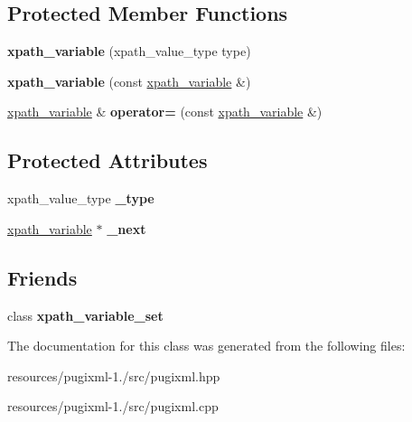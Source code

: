 \subsection*{Protected Member Functions}
\begin{DoxyCompactItemize}
\item 
\hypertarget{classpugi_1_1xpath__variable_a209a8e2cf18a2fa4e37faddaa216dda2}{{\bfseries xpath\+\_\+variable} (xpath\+\_\+value\+\_\+type type)}\label{classpugi_1_1xpath__variable_a209a8e2cf18a2fa4e37faddaa216dda2}

\item 
\hypertarget{classpugi_1_1xpath__variable_a2d805ed204c1fec482f859217d1baa4a}{{\bfseries xpath\+\_\+variable} (const \hyperlink{classpugi_1_1xpath__variable}{xpath\+\_\+variable} \&)}\label{classpugi_1_1xpath__variable_a2d805ed204c1fec482f859217d1baa4a}

\item 
\hypertarget{classpugi_1_1xpath__variable_a0cd0e1223e99c0baf46488cfd2079961}{\hyperlink{classpugi_1_1xpath__variable}{xpath\+\_\+variable} \& {\bfseries operator=} (const \hyperlink{classpugi_1_1xpath__variable}{xpath\+\_\+variable} \&)}\label{classpugi_1_1xpath__variable_a0cd0e1223e99c0baf46488cfd2079961}

\end{DoxyCompactItemize}
\subsection*{Protected Attributes}
\begin{DoxyCompactItemize}
\item 
\hypertarget{classpugi_1_1xpath__variable_aefb30100ab8bf3cf2ba623dd6ffbbd35}{xpath\+\_\+value\+\_\+type {\bfseries \+\_\+type}}\label{classpugi_1_1xpath__variable_aefb30100ab8bf3cf2ba623dd6ffbbd35}

\item 
\hypertarget{classpugi_1_1xpath__variable_a0979cb72473e77a1b6d213046abfc46e}{\hyperlink{classpugi_1_1xpath__variable}{xpath\+\_\+variable} $\ast$ {\bfseries \+\_\+next}}\label{classpugi_1_1xpath__variable_a0979cb72473e77a1b6d213046abfc46e}

\end{DoxyCompactItemize}
\subsection*{Friends}
\begin{DoxyCompactItemize}
\item 
\hypertarget{classpugi_1_1xpath__variable_ae065e6f4380a8a530c7352703c09ff80}{class {\bfseries xpath\+\_\+variable\+\_\+set}}\label{classpugi_1_1xpath__variable_ae065e6f4380a8a530c7352703c09ff80}

\end{DoxyCompactItemize}


The documentation for this class was generated from the following files\+:\begin{DoxyCompactItemize}
\item 
resources/pugixml-\/1./src/pugixml.\+hpp\item 
resources/pugixml-\/1./src/pugixml.\+cpp\end{DoxyCompactItemize}
